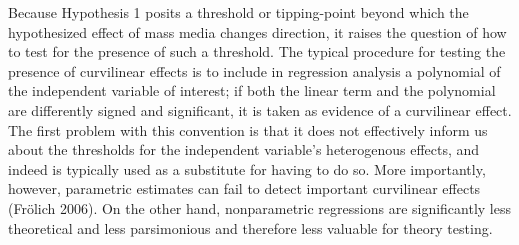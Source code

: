\documentclass[11pt,article,oneside]{memoir}
\begin{document}
Because Hypothesis 1 posits a threshold or tipping-point beyond which
the hypothesized effect of mass media changes direction, it raises the
question of how to test for the presence of such a threshold. The
typical procedure for testing the presence of curvilinear effects is to
include in regression analysis a polynomial of the independent variable
of interest; if both the linear term and the polynomial are differently
signed and significant, it is taken as evidence of a curvilinear effect.
The first problem with this convention is that it does not effectively
inform us about the thresholds for the independent variable's
heterogenous effects, and indeed is typically used as a substitute for
having to do so. More importantly, however, parametric estimates can
fail to detect important curvilinear effects (Fr{ö}lich 2006). On the
other hand, nonparametric regressions are significantly less theoretical
and less parsimonious and therefore less valuable for theory testing.
\end{document}
